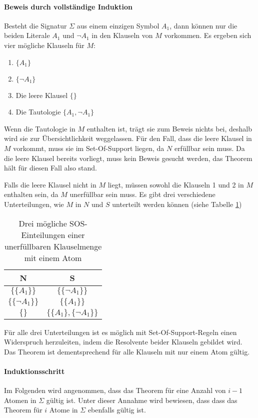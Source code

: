 \paragraph{Beweis durch vollständige Induktion}
Besteht die Signatur $\Sigma$ aus einem einzigen Symbol $A_1$, dann können nur die beiden Literale $A_1$ und $\neg A_1$ in den Klauseln von $M$ vorkommen.
Es ergeben sich vier mögliche Klauseln für $M$: 
\begin{enumerate}
	\item $\{A_1\}$
	\item $\{\neg A_1\}$
	\item Die leere Klausel $\{\}$
	\item Die Tautologie $\{A_1,\neg A_1\}$
\end{enumerate}
Wenn die Tautologie in $M$ enthalten ist, trägt sie zum Beweis nichts bei, deshalb wird sie zur Übersichtlichkeit weggelassen.
Für den Fall, dass die leere Klausel in $M$ vorkommt, muss sie im Set-Of-Support liegen, da $N$ erfüllbar sein muss. Da die leere Klausel bereits vorliegt, muss kein Beweis gesucht werden, das Theorem hält für diesen Fall also stand. 

Falls die leere Klausel nicht in $M$ liegt, müssen sowohl die Klauseln 1 und 2 in $M$ enthalten sein, da $M$ unerfüllbar sein muss. Es gibt drei verschiedene Unterteilungen, wie $M$ in $N$ und $S$ unterteilt werden können (siehe Tabelle \ref{table:sos-one-atom})
\begin{table}[h]
	\centering
	\begin{tabular}{c|c}
		N & S \\ \hline
		$\big\{\{A_1\}\big\}$ & $\big\{\{\neg A_1\}\big\}$ \\
		$\big\{\{\neg A_1\}\big\}$ & $\big\{\{A_1\}\big\}$ \\	
		$\big\{\big\}$ & $\big\{\{A_1\},\{\neg A_1\}\big\}$
	\end{tabular}
	\caption{Drei mögliche SOS-Einteilungen einer unerfüllbaren Klauselmenge mit einem Atom}
	\label{table:sos-one-atom}
\end{table}

Für alle drei Unterteilungen ist es möglich mit Set-Of-Support-Regeln einen Widerspruch herzuleiten, indem die Resolvente beider Klauseln gebildet wird. Das Theorem ist dementsprechend für alle Klauseln mit nur einem Atom gültig.

\paragraph{Induktionsschritt} Im Folgenden wird angenommen, dass das Theorem für eine Anzahl von $i-1$ Atomen in $\Sigma$ gültig ist. Unter dieser Annahme wird bewiesen, dass dass das Theorem für $i$ Atome in $\Sigma$ ebenfalls gültig ist.

